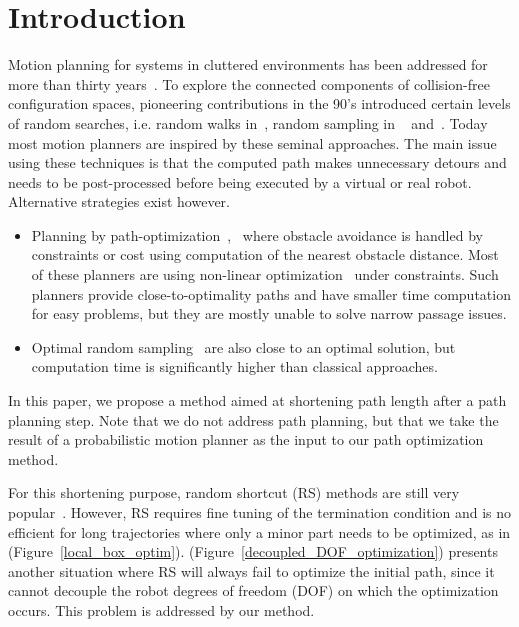 \documentclass{tADR2e}
\begin{document}
\section{Introduction}
Motion planning for systems in cluttered environments has been addressed for more
than thirty years~\cite{ref-motionplan}. 
To explore the connected components of collision-free configuration spaces, pioneering 
contributions in the 90’s introduced certain levels of random searches, i.e. random walks in~\cite{potentielBarraquandLatombe}, random sampling in 
~\cite{KavrakiLatombePRM} and~\cite{LaValleKuffnerRRT}. Today most motion planners are inspired by these seminal approaches.
The main issue using these techniques is that the computed path makes unnecessary 
detours and needs to be post-processed before being executed by a virtual or real 
robot. Alternative strategies exist however.
\begin{itemize}
\item Planning by path-optimization~\cite{itomp2012},~\cite{voronoiOMP} where
obstacle avoidance is handled by constraints or cost using computation of the
nearest obstacle distance. Most of these planners are using non-linear
optimization~\cite{BettsNonlinopt} under constraints. Such planners provide close-to-optimality paths and have smaller time computation
for easy problems, but they are mostly unable to solve narrow passage issues.
 
\item Optimal random sampling~\cite{KaramanPRMstarRRTstar} are also close to an
optimal solution, but computation time is significantly higher than classical
approaches.
\end{itemize}

In this paper, we propose a method aimed at shortening path length after a path
planning step. Note that we do not address path planning, but that we take the
result of a probabilistic motion planner as the input to our path optimization 
method.

For this shortening purpose, random shortcut (RS) methods are
still very 
popular~\cite{Sekhavat-Svestka1998,Geraerts04clearancebased,HauserFastSmooth}. 
However, RS requires fine 
tuning of the termination condition and is no efficient for long 
trajectories where only a minor part needs to be optimized, 
as in (Figure~\ref{local_box_optim}).
(Figure~\ref{decoupled_DOF_optimization}) presents another situation where RS 
will always fail to optimize the initial path, since it cannot decouple the 
robot degrees of freedom (DOF) on which the optimization occurs. This problem is 
addressed by our method.
\end{document}
